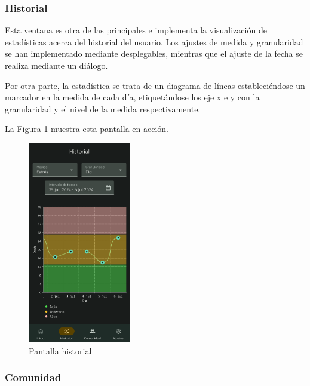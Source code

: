                \clearpage  %
            \subsubsection*{Historial}
                Esta ventana es otra de las principales e implementa la visualización de estadísticas acerca del historial del usuario. Los ajustes de medida y granularidad se han implementado mediante desplegables, mientras que el ajuste de la fecha se realiza mediante un diálogo.

                Por otra parte, la estadística se trata de un diagrama de líneas estableciéndose un marcador en la medida de cada día, etiquetándose los eje x e y con la granularidad y el nivel de la medida respectivamente.
                
                La Figura \ref{figure:implementacion:pantalla:historial} muestra esta pantalla en acción.
                
                \begin{figure}[h]
                	\centering
                	\includegraphics[width=0.4\textwidth]{figures/pantallas/Historial.png}
                	\caption{Pantalla historial}
                	\label{figure:implementacion:pantalla:historial}
                \end{figure}
                
                \clearpage  %
            \subsubsection*{Comunidad}
                
